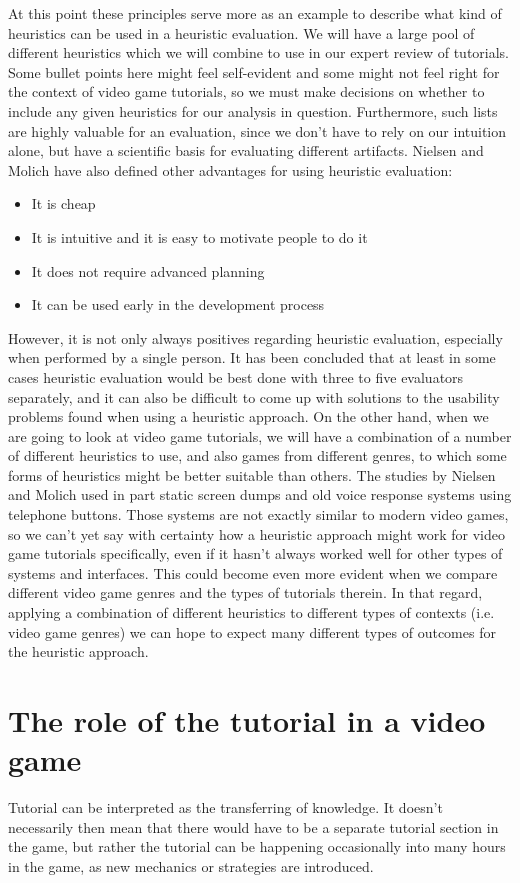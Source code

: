 At this point these principles serve more as an example to describe what kind of heuristics can be used in a heuristic evaluation. We will have a large pool of different heuristics which we will combine to use in our expert review of tutorials. Some bullet points here might feel self-evident and some might not feel right for the context of video game tutorials, so we must make decisions on whether to include any given heuristics for our analysis in question. Furthermore, such lists are highly valuable for an evaluation, since we don't have to rely on our intuition alone, but have a scientific basis for evaluating different artifacts. Nielsen and Molich have also defined other advantages for using heuristic evaluation: \cite{Nielsen1990}

\begin{itemize}
	\item It is cheap
	\item It is intuitive and it is easy to motivate people to do it
	\item It does not require advanced planning
	\item It can be used early in the development process
\end{itemize}

However, it is not only always positives regarding heuristic evaluation, especially when performed by a single person. It has been concluded that at least in some cases heuristic evaluation would be best done with three to five evaluators separately, and it can also be difficult to come up with solutions to the usability problems found when using a heuristic approach. \cite{Nielsen1990} On the other hand, when we are going to look at video game tutorials, we will have a combination of a number of different heuristics to use, and also games from different genres, to which some forms of heuristics might be better suitable than others. The studies by Nielsen and Molich used in part static screen dumps and old voice response systems using telephone buttons. Those systems are not exactly similar to modern video games, so we can't yet say with certainty how a heuristic approach might work for video game tutorials specifically, even if it hasn't always worked well for other types of systems and interfaces. This could become even more evident when we compare different video game genres and the types of tutorials therein. In that regard, applying a combination of different heuristics to different types of contexts (i.e. video game genres) we can hope to expect many different types of outcomes for the heuristic approach.

\section{The role of the tutorial in a video game}

Tutorial can be interpreted as the transferring of knowledge. It doesn't necessarily then mean that there would have to be a separate tutorial section in the game, but rather the tutorial can be happening occasionally into many hours in the game, as new mechanics or strategies are introduced.
